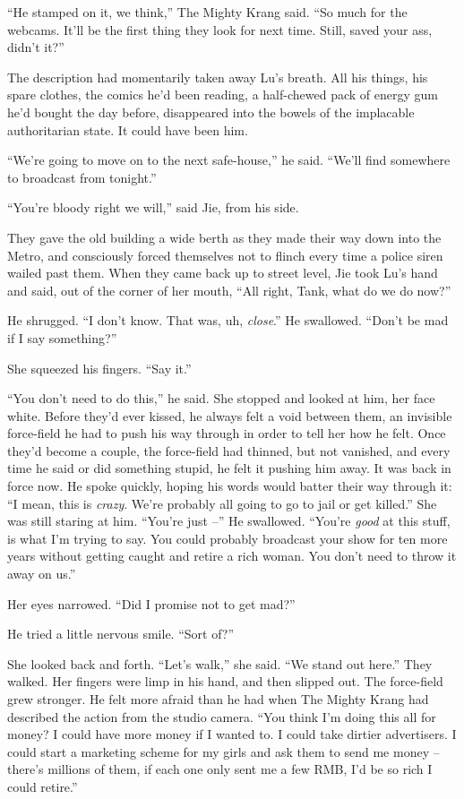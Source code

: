 ``He stamped on it, we think,'' The Mighty Krang said. ``So much for
the webcams. It'll be the first thing they look for next time.
Still, saved your ass, didn't it?''

The description had momentarily taken away Lu's breath. All his
things, his spare clothes, the comics he'd been reading, a
half-chewed pack of energy gum he'd bought the day before,
disappeared into the bowels of the implacable authoritarian state.
It could have been him.

``We're going to move on to the next safe-house,'' he said. ``We'll
find somewhere to broadcast from tonight.''

``You're bloody right we will,'' said Jie, from his side.

They gave the old building a wide berth as they made their way down
into the Metro, and consciously forced themselves not to flinch
every time a police siren wailed past them. When they came back up
to street level, Jie took Lu's hand and said, out of the corner of
her mouth, ``All right, Tank, what do we do now?''

He shrugged. ``I don't know. That was, uh, \emph{close}.'' He
swallowed. ``Don't be mad if I say something?''

She squeezed his fingers. ``Say it.''

``You don't need to do this,'' he said. She stopped and looked at
him, her face white. Before they'd ever kissed, he always felt a
void between them, an invisible force-field he had to push his way
through in order to tell her how he felt. Once they'd become a
couple, the force-field had thinned, but not vanished, and every
time he said or did something stupid, he felt it pushing him away.
It was back in force now. He spoke quickly, hoping his words would
batter their way through it: ``I mean, this is \emph{crazy}. We're
probably all going to go to jail or get killed.'' She was still
staring at him. ``You're just --'' He swallowed. ``You're \emph{good}
at this stuff, is what I'm trying to say. You could probably
broadcast your show for ten more years without getting caught and
retire a rich woman. You don't need to throw it away on us.''

Her eyes narrowed. ``Did I promise not to get mad?''

He tried a little nervous smile. ``Sort of?''

She looked back and forth. ``Let's walk,'' she said. ``We stand out
here.'' They walked. Her fingers were limp in his hand, and then
slipped out. The force-field grew stronger. He felt more afraid
than he had when The Mighty Krang had described the action from the
studio camera. ``You think I'm doing this all for money? I could
have more money if I wanted to. I could take dirtier advertisers. I
could start a marketing scheme for my girls and ask them to send me
money -- there's millions of them, if each one only sent me a few
RMB, I'd be so rich I could retire.''

